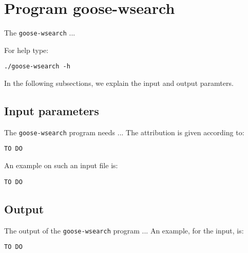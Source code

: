 \section{Program goose-wsearch}
The \texttt{goose-wsearch} ...

For help type:
\begin{lstlisting}
./goose-wsearch -h
\end{lstlisting}
In the following subsections, we explain the input and output paramters.

\subsection*{Input parameters}

The \texttt{goose-wsearch} program needs ...
The attribution is given according to:
\begin{lstlisting}
TO DO
\end{lstlisting}

An example on such an input file is:
\begin{lstlisting}
TO DO
\end{lstlisting}

\subsection*{Output}
The output of the \texttt{goose-wsearch} program ...
An example, for the input, is:
\begin{lstlisting}
TO DO
\end{lstlisting}
